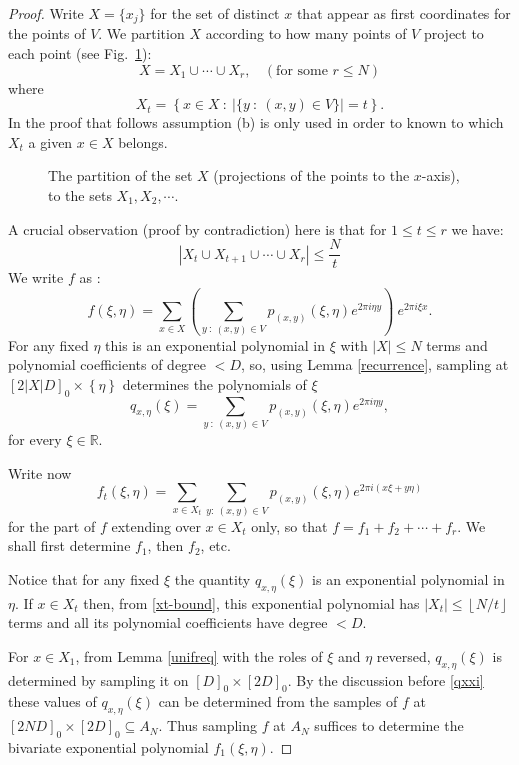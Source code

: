 \documentclass[12pt,a4paper,oneside]{amsart}
\theoremstyle{definition}
\newcommand{\Abs}[1]{{\left|{#1}\right|}}
\newcommand{\Floor}[1]{{\left\lfloor{#1}\right\rfloor}}
\newcommand{\Set}[1]{{\left\{{#1}\right\}}}
\newcommand{\RR}{{\mathbb R}}
\begin{document}
\begin{proof}


Write $X=\{ x_j \}$ for the set of distinct $x$ that appear as first coordinates for the points of $V$. We partition $X$ according to how many points of $V$ project to each point (see Fig.\ \ref{fig:partition}):
\begin{equation*}
X=X_1 \cup \cdots \cup X_r, \ \ \ \ (\text{for some }r \le N)
\end{equation*}
 where
$$
X_t = \Set{ x\in X \ :\ \left| \{y \ :\ (x,y) \in V\} \right| = t }.
$$
In the proof that follows assumption (b) is only used in order to known to which $X_t$ a given $x\in X$ belongs.

\begin{figure}[h]
 
 \caption{The partition of the set $X$ (projections of the points to the $x$-axis), to the sets $X_1, X_2, \cdots$.}\label{fig:partition}
\end{figure}

A crucial observation (proof by contradiction) here is that for $1\le t \le r$ we have:
\begin{equation}\label{xt-bound}
\Abs{X_t \cup X_{t+1} \cup \cdots \cup X_r} \le \frac{N}{t}
\end{equation}
We write $f$ as :
$$
f(\xi,\eta)=\sum_{x\in X} \left( \sum_{y\: : \: (x,y) \in V} p_{(x,y)}(\xi,\eta) e^{2\pi i \eta y} \right )\: e^{2\pi i \xi x}.
$$
For any fixed $\eta$ this is an exponential polynomial in $\xi$ with $\Abs{X} \le N$ terms and polynomial coefficients of degree $<D$, so, using Lemma \ref{recurrence}, sampling at $[2\Abs{X}D]_0 \times \Set{\eta}$ determines the polynomials of $\xi$
\begin{equation}\label{qxxi}
q_{x, \eta}(\xi) = \sum_{y \ :\ (x,y) \in V} p_{(x,y)}(\xi, \eta) e^{2\pi i \eta y},
\end{equation}
for every $\xi \in \RR$.

Write now
$$
f_t(\xi, \eta) = \sum_{x \in X_t} \sum_{y:\ (x, y) \in V} p_{(x, y)}(\xi, \eta) e^{2\pi i (x\xi+y\eta)}
$$
for the part of $f$ extending over $x \in X_t$ only, so that $f = f_1+f_2+\cdots+f_r$. We shall first determine $f_1$, then $f_2$, etc.

Notice that for any fixed $\xi$ the quantity $q_{x, \eta}(\xi)$ is an exponential polynomial in $\eta$. If $x \in X_t$ then, from \eqref{xt-bound}, this exponential polynomial has $\Abs{X_t} \le \Floor{N/t}$ terms and all its polynomial coefficients have degree $<D$.

For $x \in X_1$, from Lemma \ref{unifreq} with the roles of $\xi$ and $\eta$ reversed, 
$q_{x, \eta}(\xi)$ is determined by sampling it on $[D]_0 \times [2D]_0$. By the discussion before \eqref{qxxi} these values of $q_{x, \eta}(\xi)$ can be determined from the samples of $f$ at $[2ND]_0 \times [2D]_0 \subseteq A_N$. Thus sampling $f$ at $A_N$ suffices to determine the bivariate exponential polynomial $f_1(\xi, \eta)$.


\end{proof}
\end{document}

